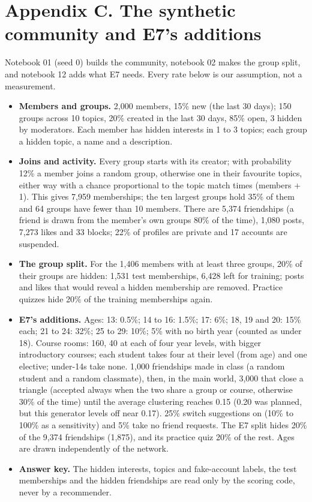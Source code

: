 \documentclass[11pt,letterpaper]{article}
\begin{document}
\section{Appendix C. The synthetic community and E7's additions}

Notebook 01 (seed 0) builds the community, notebook 02 makes the group split, and notebook 12 adds what E7
needs. Every rate below is our assumption, not a measurement.

\begin{itemize}
\item \textbf{Members and groups.} 2,000 members, 15\% new (the last 30 days); 150 groups across 10 topics,
20\% created in the last 30 days, 85\% open, 3 hidden by moderators. Each member has hidden interests in 1 to
3 topics; each group a hidden topic, a name and a description.
\item \textbf{Joins and activity.} Every group starts with its creator; with probability 12\% a member joins a
random group, otherwise one in their favourite topics, either way with a chance proportional to the topic
match times (members + 1). This gives 7,959 memberships; the ten largest groups hold 35\% of them and 64
groups have fewer than 10 members. There are 5,374 friendships (a friend is drawn from the member's own groups
80\% of the time), 1,080 posts, 7,273 likes and 33 blocks; 22\% of profiles are private and 17 accounts are
suspended.
\item \textbf{The group split.} For the 1,406 members with at least three groups, 20\% of their groups are
hidden: 1,531 test memberships, 6,428 left for training; posts and likes that would reveal a hidden membership
are removed. Practice quizzes hide 20\% of the training memberships again.
\item \textbf{E7's additions.} Ages: 13: 0.5\%; 14 to 16: 1.5\%; 17: 6\%; 18, 19 and 20: 15\% each; 21 to 24:
32\%; 25 to 29: 10\%; 5\% with no birth year (counted as under 18). Course rooms: 160, 40 at each of four year
levels, with bigger introductory courses; each student takes four at their level (from age) and one elective;
under-14s take none. 1,000 friendships made in class (a random student and a random classmate), then, in the
main world, 3,000 that close a triangle (accepted always when the two share a group or course, otherwise 30\%
of the time) until the average clustering reaches 0.15 (0.20 was planned, but this generator levels off near
0.17). 25\% switch suggestions on (10\% to 100\% as a sensitivity) and 5\% take no friend requests. The E7
split hides 20\% of the 9,374 friendships (1,875), and its practice quiz 20\% of the rest. Ages are drawn
independently of the network.
\item \textbf{Answer key.} The hidden interests, topics and fake-account labels, the test memberships and the
hidden friendships are read only by the scoring code, never by a recommender.
\end{itemize}
\end{document}
